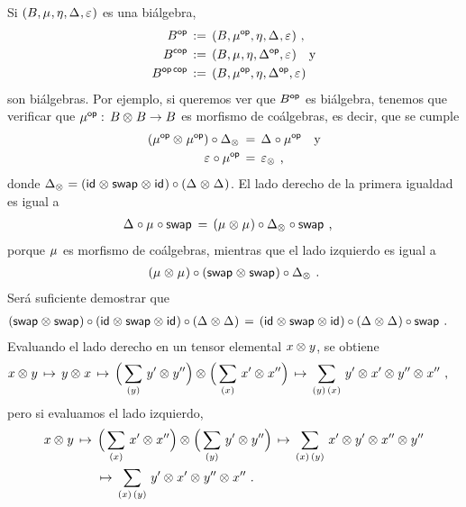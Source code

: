 Si $(B,\producto,\unidad,\coproducto,\counidad)$ es una bi\'{a}lgebra,
\begin{align*}
	B^\opp & \,:=\,(B,\producto^\opp,\unidad,\coproducto,\counidad)
		\text{ ,} \\
	B^\copp & \,:=\,(B,\producto,\unidad,\coproducto^\opp,\counidad)
		\quad\text{y} \\
	B^{\opp\,\copp} & \,:=\,
		(B,\producto^\opp,\unidad,\coproducto^\opp,\counidad)
\end{align*}
%
son bi\'{a}lgebras. Por ejemplo, si queremos ver que $B^\opp$ es bi\'{a}lgebra,
tenemos que verificar que $\producto^\opp:\,B\tensor B\rightarrow B$ es
morfismo de co\'{a}lgebras, es decir, que se cumple
\begin{align*}
	(\producto^\opp\tensor\producto^\opp)\circ\coproducto[\tensor] & \,=\,
		\coproducto\circ\producto^\opp \quad\text{y} \\
	\counidad\circ\producto^\opp & \,=\,\counidad[\tensor]
	\text{ ,}
\end{align*}
%
donde
\begin{math}
	\coproducto[\tensor]=(\id\tensor\swap\tensor\id)\circ
		(\coproducto\tensor\coproducto)
\end{math}. El lado derecho de la primera igualdad es igual a
\begin{align*}
	\coproducto\circ\producto\circ\swap & \,=\,
		(\producto\tensor\producto)\circ\coproducto[\tensor]\circ\swap
	\text{ ,}
\end{align*}
%
porque $\producto$ es morfismo de co\'{a}lgebras, mientras que el lado
izquierdo es igual a
\begin{align*}
	(\producto\tensor\producto)\circ(\swap\tensor\swap)\circ
		\coproducto[\tensor]
	\text{ .}
\end{align*}
%
Ser\'{a} suficiente demostrar que
\begin{align*}
	(\swap\tensor\swap)\circ(\id\tensor\swap\tensor\id)\circ
		(\coproducto\tensor\coproducto) & \,=\,
	(\id\tensor\swap\tensor\id)\circ(\coproducto\tensor\coproducto)\circ
		\swap
	\text{ .}
\end{align*}
%
Evaluando el lado derecho en un tensor elemental $x\tensor y$, se obtiene
\begin{align*}
	& x\tensor y \,\mapsto\, y\tensor x\,\mapsto\,
		\Big(\sum_{(y)}\,y'\tensor y''\Big)\tensor
			\Big(\sum_{(x)}\,x'\tensor x''\Big)\,\mapsto\,
		\sum_{(y)\,(x)}\,y'\tensor x'\tensor y''\tensor x''
	\text{ ,}
\end{align*}
%
pero si evaluamos el lado izquierdo,
\begin{align*}
	& x\tensor y\,\mapsto\, \Big(\sum_{(x)}\,x'\tensor x''\Big)\tensor
		\Big(\sum_{(y)}\,y'\tensor y''\Big)\,\mapsto\,
		\sum_{(x)\,(y)}\,x'\tensor y'\tensor x''\tensor y''\\
	& \qquad\qquad\,\mapsto\,
		\sum_{(x)\,(y)}\,y'\tensor x'\tensor y''\tensor x''
	\text{ .}
\end{align*}
